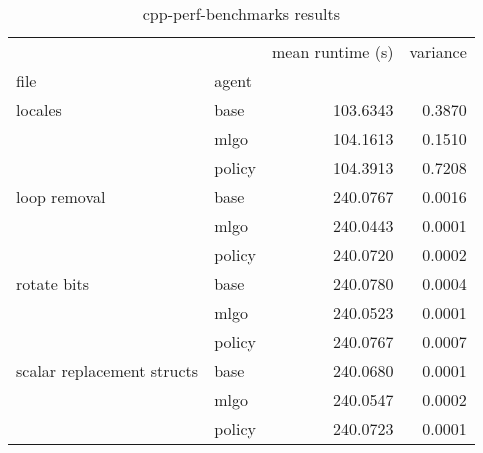 \begin{table}[h]
    \caption{cpp-perf-benchmarks results}
    \label{table:cpp-perf-benchmarks}
    \begin{tabular}{llrr}
\toprule
                           &        &  mean runtime (s) &  variance \\
file & agent &               &           \\
\midrule
locales & base &      103.6343 &    0.3870 \\
                           & mlgo &      104.1613 &    0.1510 \\
                           & policy &      104.3913 &    0.7208 \\
loop removal & base &      240.0767 &    0.0016 \\
                           & mlgo &      240.0443 &    0.0001 \\
                           & policy &      240.0720 &    0.0002 \\
rotate bits & base &      240.0780 &    0.0004 \\
                           & mlgo &      240.0523 &    0.0001 \\
                           & policy &      240.0767 &    0.0007 \\
scalar replacement structs & base &      240.0680 &    0.0001 \\
                           & mlgo &      240.0547 &    0.0002 \\
                           & policy &      240.0723 &    0.0001 \\
\bottomrule
\end{tabular}
\end{table}
